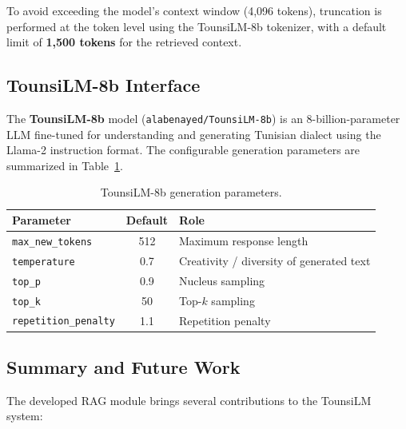 To avoid exceeding the model's context window (4,096 tokens), truncation is performed
at the token level using the TounsiLM-8b tokenizer, with a default limit of
\textbf{1,500 tokens} for the retrieved context.

\subsection{TounsiLM-8b Interface}
\label{subsec:llm}

The \textbf{TounsiLM-8b} model (\texttt{alabenayed/TounsiLM-8b}) is an 8-billion-parameter
LLM fine-tuned for understanding and generating Tunisian dialect using the
Llama-2 instruction format. The configurable generation parameters are summarized
in Table~\ref{tab:gen_params}.

\begin{table}[htbp]
\centering
\begin{tabular}{@{} l c l @{}}
\toprule
\textbf{Parameter}         & \textbf{Default} & \textbf{Role} \\
\midrule
\texttt{max\_new\_tokens}    & 512   & Maximum response length \\
\texttt{temperature}         & 0.7   & Creativity / diversity of generated text \\
\texttt{top\_p}              & 0.9   & Nucleus sampling \\
\texttt{top\_k}              & 50    & Top-$k$ sampling \\
\texttt{repetition\_penalty} & 1.1   & Repetition penalty \\
\bottomrule
\end{tabular}
\caption{TounsiLM-8b generation parameters.}
\label{tab:gen_params}
\end{table}

\subsection{Summary and Future Work}
\label{subsec:summary}

The developed RAG module brings several contributions to the TounsiLM system:

